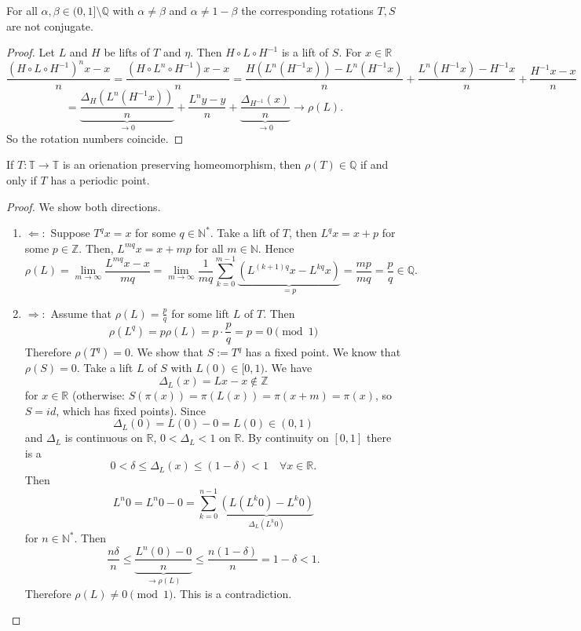 \documentclass{article}
\newcommand*{\N}{\mathbb{N}}
\newcommand*{\Z}{\mathbb{Z}}
\newcommand*{\Q}{\mathbb{Q}}
\newcommand*{\R}{\mathbb{R}}
\newcommand*{\T}{\mathbb{T}}
\newcommand*{\Ns}{\N^*}
\newcommand*{\reci}[1]{{\frac{1}{#1}}}
\begin{document}
\begin{exam}
    For all $\alpha,\beta \in (0,1]\setminus\Q$ with $\alpha \neq \beta$ and $\alpha \neq 1-\beta$ the corresponding rotations $T,S$ are not conjugate.
\end{exam}

\begin{proof}
    Let $L$ and $H$ be lifts of $T$ and $\eta$. Then $H\circ L\circ H^{-1}$ is a lift of $S$. For $x\in\R$
    $$\frac{(H\circ L\circ H^{-1})^nx-x}n=\frac{(H\circ L^n\circ H^{-1})x-x}n=\frac{H(L^n(H^{-1}x))-L^n(H^{-1}x)}n+\frac{L^n(H^{-1}x)-H^{-1}x}n+\frac{H^{-1}x-x}n$$
    $$=\underbrace{\frac{\Delta_H(L^n(H^{-1}x))}n}_{\to0}+\frac{L^ny-y}n+\underbrace{\frac{\Delta_{H^{-1}}(x)}n}_{\to0} \to \rho(L).$$
    So the rotation numbers coincide.
\end{proof}

\begin{prop}
    If $T:\T\to\T$ is an orienation preserving homeomorphism, then $\rho(T) \in\Q$ if and only if $T$ has a periodic point.
\end{prop}

\begin{proof}
    We show both directions.
    \begin{enumerate}
        \item $\Leftarrow:$ Suppose $T^qx=x$ for some $q\in\Ns$. Take a lift of $T$, then $L^qx=x+p$ for some $p\in\Z$. Then, $L^{mq}x = x+mp$ for all $m \in \N$. Hence
        $$\rho(L)=\lim_{m\to\infty} \frac{L^{mq}x-x}{mq}=\lim_{m\to\infty}\reci{mq}\sum_{k=0}^{m-1}\underbrace{(L^{(k+1)q}x-L^{kq}x)}_{=p}=\frac{mp}{mq}=\frac pq \in\Q.$$

        \item $\Rightarrow:$ Assume that $\rho(L)=\frac pq$ for some lift $L$ of $T$. Then
        $$\rho(L^q)=p\rho(L) = p\cdot\frac pq = p = 0 \pmod1$$
        Therefore $\rho(T^q) = 0$. We show that $S:=T^q$ has a fixed point. We know that $\rho(S)=0$. Take a lift $L$ of $S$ with $L(0) \in [0,1)$. We have
        $$\Delta_L(x)=Lx-x\notin \Z$$
        for $x \in \R$ (otherwise: $S(\pi(x))=\pi(L(x))=\pi(x+m)=\pi(x)$, so $S = id$, which has fixed points). Since
        $$\Delta_L(0)=L(0)-0=L(0)\in(0,1)$$
        and $\Delta_L$ is continuous on $\R$, $0<\Delta_L<1$ on $\R$. By continuity on $[0,1]$ there is a
        $$0<\delta\leq \Delta_L(x)\leq (1-\delta)<1 \quad\forall x \in\R.$$
        Then
        $$L^n0=L^n0-0 = \sum_{k=0}^{n-1}\underbrace{(L(L^k0)-L^k0)}_{\Delta_L(L^k0)}$$
        for $n\in\Ns$. Then
        $$\frac{n\delta}n \leq \underbrace{\frac{L^n(0)-0}n}_{\to\rho(L)}\leq \frac{n(1-\delta)}n = 1-\delta<1.$$
        Therefore $\rho(L) \neq 0 \pmod1$. This is a contradiction.
    \end{enumerate}
\end{proof}
\end{document}
